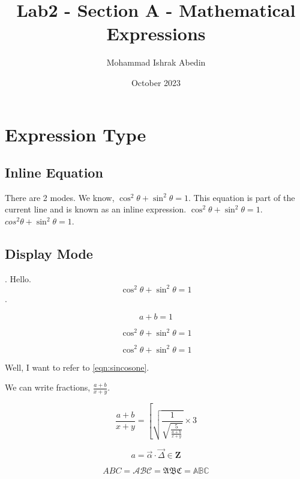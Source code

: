 \documentclass[12pt, a4paper]{article}
\title{Lab2 - Section A - Mathematical Expressions}
\author{Mohammad Ishrak Abedin}
\date{October 2023}
\begin{document}
\maketitle

\section{Expression Type}
\subsection{Inline Equation}
There are 2 modes. We know, $\cos^2\theta + \sin^2\theta = 1$. This equation is part of the current line and is known as an inline expression. \(\cos^2\theta + \sin^2\theta = 1\). \begin{math}
    cos^2\theta + \sin^2\theta = 1
\end{math}.

\subsection{Display Mode}
\lipsum[1][1-5]. Hello. \[ \cos^2\theta + \sin^2\theta = 1 \].

\begin{equation*}
    a + b = 1
\end{equation*}

\begin{equation} \label{eqn:sincosone}
    \cos^2\theta + \sin^2\theta = 1
\end{equation}

\begin{displaymath}
    \cos^2\theta + \sin^2\theta = 1
\end{displaymath}

Well, I want to refer to \autoref{eqn:sincosone}.

We can write fractions, $\frac{a + b}{x + y}$.

\begin{equation}
    \frac{a + b}{x + y} = \left[ \sqrt{\frac{1}{\sqrt{\frac{5}{\frac{a + b}{x + y}}}}} \times 3 \right.
\end{equation}

\begin{equation}
    a = \vec{\alpha} \cdot \vec{\Delta} \in \mathbf{Z}
\end{equation}

\begin{equation}
    ABC = \mathcal{ABC} = \mathfrak{ABC} = \mathbb{ABC}
\end{equation}
\end{document}
